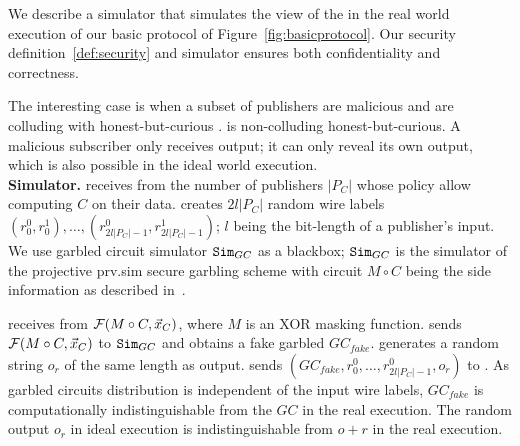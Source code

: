 %
%
%
%
%
%
%

We describe a simulator \Sim that simulates the view of the \Adv in the real
world execution of our basic protocol of Figure~\ref{fig:basicprotocol}. Our
security definition~\ref{def:security} and simulator \Sim ensures both
confidentiality and correctness.

The interesting case is when a subset of publishers are malicious and are
colluding with honest-but-curious \broker. \garbler is non-colluding
honest-but-curious. A malicious subscriber only receives output; it can only
reveal its own output, which is also possible in the ideal world execution.\\

\noindent\textbf{Simulator.} \Sim receives from \F the number of publishers
$|P_C|$ whose policy allow computing $C$ on their data. \Sim creates $2l|P_C|$
random wire labels $(r_0^0, r_0^1), \ldots, (r_{2l|P_C|-1}^0
,r_{2l|P_C|-1}^1)$; $l$ being the bit-length of a publisher's input. We use
garbled circuit simulator $\texttt{Sim}_{GC}$ as a blackbox; $\texttt{Sim}_{GC}$ is the
simulator of the projective prv.sim secure garbling scheme with circuit $M
\circ C$ being the side information as described in~\cite{}. 

\Sim receives from \F $\mathcal{F}(M \circ C, \vec{x}_C)$, where $M$ is an XOR masking
function. \Sim sends $\mathcal{F}(M \circ C, \vec{x}_C)$ to $\texttt{Sim}_{GC}$ and obtains a
fake garbled $GC_{fake}$. \Sim generates a random string $o_r$ of the same
length as output. \Sim sends $(GC_{fake}, r_0^0, \ldots, r_{2l|P_C|-1}^0, o_r)$
to \Adv. As garbled circuits distribution is independent of the input wire
labels, $GC_{fake}$ is computationally indistinguishable from the $GC$ in the
real execution. The random output $o_r$ in ideal execution is indistinguishable
from $o+r$ in the real execution.

